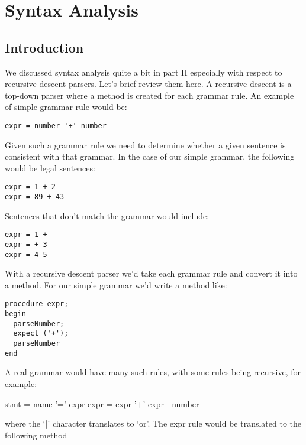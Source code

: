 {\bfseries\slshape\sffamily\color{ChapterTitleColor} \chapter{Syntax Analysis}} \label{chap:syntaxanalysis}

\section{Introduction}

We discussed syntax analysis quite a bit in part II especially with respect to recursive descent parsers. Let's brief review them here. A recursive descent is a top-down parser where a method is created for each grammar rule. An example of simple grammar rule would be:

\begin{lstlisting}
expr = number '+' number
\end{lstlisting}

Given such a grammar rule we need to determine whether a given sentence is consistent with that grammar. In the case of our simple grammar, the following would be legal sentences:

\begin{lstlisting}
expr = 1 + 2
expr = 89 + 43
\end{lstlisting}

Sentences that don't match the grammar would include:

\begin{lstlisting}
expr = 1 +
expr = + 3
expr = 4 5
\end{lstlisting}

With a recursive descent parser we'd take each grammar rule and convert it into a method. For our simple grammar we'd write a method like:

\begin{lstlisting}
procedure expr;
begin
  parseNumber;
  expect ('+');
  parseNumber
end
\end{lstlisting}

A real grammar would have many such rules, with some rules being recursive, for example:

\begin{lcverbatim}
stmt =   name '=' expr
expr =   expr '+' expr
       | number
\end{lcverbatim}

where the `|' character translates to `or'. The expr rule would be translated to the following method

